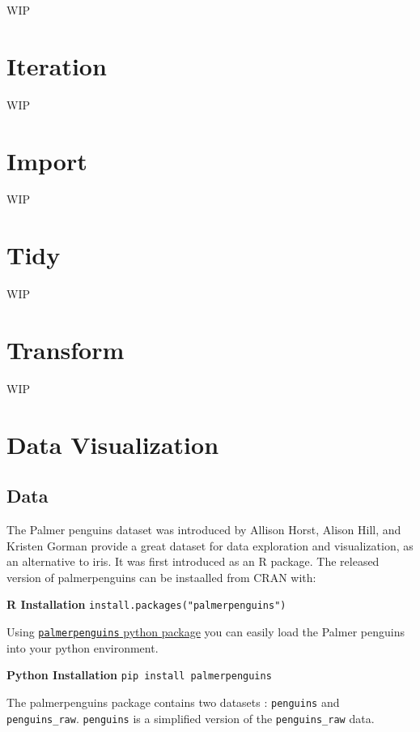 \documentclass[]{book}
\begin{document}
WIP

\hypertarget{iteration}{%
\chapter{Iteration}\label{iteration}}

WIP

\hypertarget{import}{%
\chapter{Import}\label{import}}

WIP

\hypertarget{tidy}{%
\chapter{Tidy}\label{tidy}}

WIP

\hypertarget{transform}{%
\chapter{Transform}\label{transform}}

WIP

\hypertarget{data-visualization}{%
\chapter{Data Visualization}\label{data-visualization}}

\hypertarget{data}{%
\section{Data}\label{data}}

The Palmer penguins dataset was introduced by Allison Horst, Alison Hill, and Kristen Gorman provide a great dataset for data exploration and visualization, as an alternative to iris. It was first introduced as an R package. The released version of palmerpenguins can be instaalled from CRAN with:

\textbf{R Installation}
\texttt{install.packages("palmerpenguins")}

Using \href{https://pypi.org/project/palmerpenguins/}{\texttt{palmerpenguins} python package} you can easily load the Palmer penguins into your python environment.

\textbf{Python Installation}
\texttt{pip\ install\ palmerpenguins}

The palmerpenguins package contains two datasets : \texttt{penguins} and \texttt{penguins\_raw}. \texttt{penguins} is a simplified version of the \texttt{penguins\_raw} data.
\end{document}
